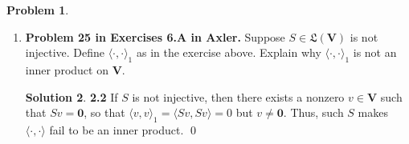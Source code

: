 \documentclass{book}
\theoremstyle{definition}
\newtheorem*{prob*}{Problem}
\newtheorem*{sln*}{Solution}
\newcommand{\V}{\mathbf{V}}
\newcommand{\LL}{\mathfrak{L}}
\newcommand{\la}{\langle}
\newcommand{\ra}{\rangle}
\begin{document}
\begin{prob*}
\begin{enumerate}
\begin{sln*}
\begin{enumerate}
				\item \textbf{Additivity in first slot: }Let $u,w,v \in \V$ be given, then 
				\begin{align*}
				\la u+w ,v \ra_1 &= \la S(u+w), Sv \ra \\&= \la Su + Sw , Sv \ra \\
				&= \la Su, Sv \ra + \la Sw, Sv \ra \\
				&= \la u,v \ra_1 + \la w,v \ra_1,
				\end{align*}
				where the third equality is due to $\la \cdot, \cdot \ra$ being an inner product on $V$.
				\item \textbf{Homogeneity in first slot: }
				\begin{align*}
				\la \alpha u,v \ra_1 = \la S(\alpha u), Sv \ra = \la \alpha Su, Sv \ra = \alpha \la Su, Sv\ra = \alpha\la u,v\ra_1,
				\end{align*}
				where the last equality is due to $\la \cdot, \cdot \ra$ being an inner product on $V$.
				\item \textbf{Conjugate symmetry: }
				\begin{align*}
				\overline{\la v,u \ra}_1 = \overline{\la Sv, Su \ra} = \la Su, Sv \ra = \la u ,v\ra_1, 
				\end{align*}
				where the second equality is due to $\la \cdot, \cdot \ra$ being an inner product on $V$.
			\end{enumerate}\qed
		\end{sln*}
		
		
		
		
		
		
		\item \textbf{Problem 25 in Exercises 6.A in Axler.} Suppose $S \in \LL(\V)$ is not injective. Define $\la \cdot , \cdot \ra_1$ as in the exercise above. Explain why $\la \cdot, \cdot\ra_1$ is not an inner product on $\V$.
		
		\begin{sln*}\textbf{2.2} 
			If $S$ is not injective, then there exists a nonzero $v\in \V$ such that $Sv = \mathbf{0}$, so that $\la v,v \ra_1 = \la Sv, Sv \ra = 0$ but $v \neq \mathbf{0}$. Thus, such $S$ makes $\la \cdot, \cdot \ra$ fail to be an inner product. \qed
			
		\end{sln*}
		
		
	\end{enumerate}
	
\end{prob*}
\end{document}

